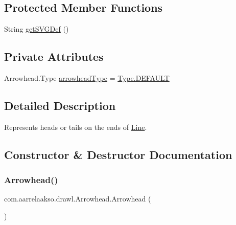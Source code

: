 \subsection*{Protected Member Functions}
\begin{DoxyCompactItemize}
\item 
String \hyperlink{classcom_1_1aarrelaakso_1_1drawl_1_1_arrowhead_a0094c4f48945d782b7e474b15ef06561}{get\+S\+V\+G\+Def} ()
\end{DoxyCompactItemize}
\subsection*{Private Attributes}
\begin{DoxyCompactItemize}
\item 
Arrowhead.\+Type \hyperlink{classcom_1_1aarrelaakso_1_1drawl_1_1_arrowhead_a72183bdf6672377d73b2d9810b6d0ed7}{arrowhead\+Type} = \hyperlink{enumcom_1_1aarrelaakso_1_1drawl_1_1_arrowhead_1_1_type_ae4c70d3cd0853637fba791f2bb29cd8e}{Type.\+D\+E\+F\+A\+U\+LT}
\end{DoxyCompactItemize}


\subsection{Detailed Description}
Represents heads or tails on the ends of \hyperlink{classcom_1_1aarrelaakso_1_1drawl_1_1_line}{Line}. 

\subsection{Constructor \& Destructor Documentation}
\mbox{\label{classcom_1_1aarrelaakso_1_1drawl_1_1_arrowhead_a866fb3900ad67226bad5962031cc7817}} 
\subsubsection{\texorpdfstring{Arrowhead()}{Arrowhead()}\hspace{0.1cm}{\footnotesize\ttfamily [1/2]}}
{\footnotesize\ttfamily com.\+aarrelaakso.\+drawl.\+Arrowhead.\+Arrowhead (\begin{DoxyParamCaption}{ }\end{DoxyParamCaption})}



